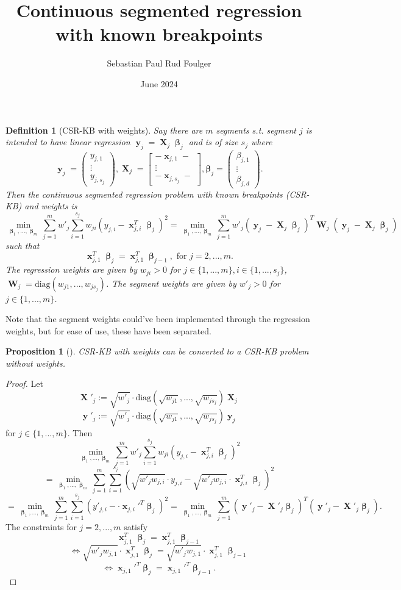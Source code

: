 \documentclass[12pt]{article}
\title{Continuous segmented regression with known breakpoints}
\author{Sebastian Paul Rud Foulger}
\date{June 2024}
\DeclareMathOperator{\bx}{\mathbf{x}}
\DeclareMathOperator{\bX}{\mathbf{X}}
\DeclareMathOperator{\by}{\mathbf{y}}
\DeclareMathOperator{\bW}{\mathbf{W}}
\DeclareMathOperator{\bbeta}{\boldsymbol{\beta}}
\newtheorem{defn}{Definition}
\newtheorem{prop}{Proposition}
\begin{document}
\begin{defn}[CSR-KB with weights]
Say there are $m$ segments s.t. segment $j$ is intended to have linear regression $\by_j = \bX_j \bbeta_j$ and is of size $s_j$ where
$$\by_j = \begin{pmatrix}
y_{j,1} \\
\vdots \\
y_{j,s_j}
\end{pmatrix}, \bX_j = 
\begin{bmatrix}
-\bx_{j,1}-  \\
\vdots \\
-\bx_{j,s_j}-
\end{bmatrix}, \boldsymbol{\beta}_j = 
\begin{pmatrix}
\beta_{j,1}  \\
\vdots \\
\beta_{j,d}
\end{pmatrix}.$$
Then the continuous segmented regression problem with known breakpoints (CSR-KB) and weights is
$$\min_{\bbeta_1,...,\bbeta_m} \sum_{j=1}^m w'_j\sum_{i=1}^{s_j} w_{ji}(y_{j, i}-\bx_{j, i}^T\bbeta_j)^2 = \min_{\bbeta_1,...,\bbeta_m} \sum_{j=1}^m w'_j (\by_j-\bX_j\bbeta_j)^T\bW_j(\by_j-\bX_j\bbeta_j)$$
such that
$$\bx_{j, 1}^T \bbeta_j = \bx_{j, 1}^T \bbeta_{j-1}, \text{ for }j=2, ..., m.$$
The regression weights are given by $w_{ji} > 0$ for $j\in \{1, ..., m\}, i \in \{1, ..., s_j\}$, $\bW_j = \text{diag}(w_{j1}, ..., w_{js_j})$. The segment weights are given by $w'_j > 0$ for $j \in \{1, ..., m\}$.
\end{defn}
Note that the segment weights could've been implemented through the regression weights, but for ease of use, these have been separated. 
\begin{prop}[] \label{prop:convert}
CSR-KB with weights can be converted to a CSR-KB problem without weights.
\end{prop}
\begin{proof}
Let
$$\bX'_j := \sqrt{w'_j} \cdot \text{diag}\left(\sqrt{w_{j1}}, ..., \sqrt{w_{js_j}}\right)\bX_j$$
$$\by'_j := \sqrt{w'_j} \cdot \text{diag}\left(\sqrt{w_{j1}}, ..., \sqrt{w_{js_j}}\right)\by_j$$
for $j \in \{1, ..., m\}$. Then
$$\min_{\bbeta_1,...,\bbeta_m} \sum_{j=1}^m w'_j\sum_{i=1}^{s_j} w_{ji}(y_{j, i}-\bx_{j, i}^T\bbeta_j)^2 $$
$$=\min_{\bbeta_1,...,\bbeta_m} \sum_{j=1}^m \sum_{i=1}^{s_j} \left(\sqrt{w'_j w_{j,i}} \cdot y_{j, i}-\sqrt{w'_j w_{j,i}} \cdot \bx_{j, i}^T\bbeta_j \right)^2 $$
$$=\min_{\bbeta_1,...,\bbeta_m} \sum_{j=1}^m \sum_{i=1}^{s_j} \left(y'_{j, i}- \cdot \bx_{j, i}'^T\bbeta_j \right)^2=\min_{\bbeta_1,...,\bbeta_m} \sum_{j=1}^m (\by'_j-\bX'_j\bbeta_j)^T(\by'_j-\bX'_j\bbeta_j).$$
The constraints for $j=2, ..., m$ satisfy
$$\bx_{j, 1}^T \bbeta_j = \bx_{j, 1}^T \bbeta_{j-1}$$
$$\iff \sqrt{w'_j w_{j,1}} \cdot \bx_{j, 1}^T \bbeta_j = \sqrt{w'_j w_{j,1}} \cdot \bx_{j, 1}^T \bbeta_{j-1} $$
$$\iff \bx_{j, 1}'^T \bbeta_j = \bx_{j, 1}'^T \bbeta_{j-1}.$$
\end{proof}
\end{document}
